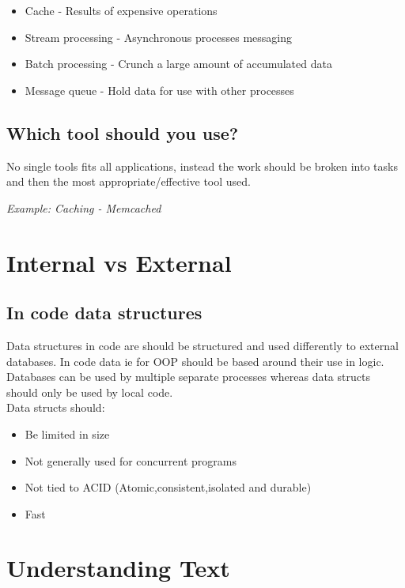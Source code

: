 \documentclass[11pt]{scrartcl} %
\begin{document}
\begin{itemize}
	\item Cache - Results of expensive operations
	\item Stream processing - Asynchronous processes messaging
	\item Batch processing - Crunch a large amount of accumulated data
	\item Message queue - Hold data for use with other processes
\end{itemize}

\subsection{Which tool should you use?}

No single tools fits all applications, instead the work should be broken into tasks
and then the most appropriate/effective tool used. 

\textit{Example: Caching - Memcached}

\section{Internal vs External}

\subsection{In code data structures}

Data structures in code are should be structured and used differently to external databases. In code
data ie for OOP should be based around their use in logic. Databases can be used by multiple separate
processes whereas data structs should only be used by local code.\\

Data structs should:

\begin{itemize}
	\item Be limited in size
	\item Not generally used for concurrent programs
	\item Not tied to ACID (Atomic,consistent,isolated and durable)
	\item Fast
\end{itemize}

\section{Understanding Text}
\end{document}
